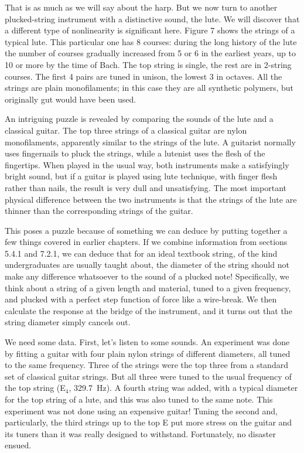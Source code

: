   That is as much as we will say about the harp. But we now turn to another 
  plucked-string instrument with a distinctive sound, the lute. We will 
  discover that a different type of nonlinearity is significant here. Figure 7 
  shows the strings of a typical lute. This particular one has 8 courses: 
  during the long history of the lute the number of courses gradually increased 
  from 5 or 6 in the earliest years, up to 10 or more by the time of Bach. The 
  top string is single, the rest are in 2-string courses. The first 4 pairs are 
  tuned in unison, the lowest 3 in octaves. All the strings are plain 
  monofilaments; in this case they are all synthetic polymers, but originally 
  gut would have been used. 


  An intriguing puzzle is revealed by comparing the sounds of the lute and a 
  classical guitar. The top three strings of a classical guitar are nylon 
  monofilaments, apparently similar to the strings of the lute. A guitarist 
  normally uses fingernails to pluck the strings, while a lutenist uses the 
  flesh of the fingertips. When played in the usual way, both instruments make 
  a satisfyingly bright sound, but if a guitar is played using lute technique, 
  with finger flesh rather than nails, the result is very dull and 
  unsatisfying. The most important physical difference between the two 
  instruments is that the strings of the lute are thinner than the 
  corresponding strings of the guitar. 

  This poses a puzzle because of something we can deduce by putting together a 
  few things covered in earlier chapters. If we combine information from 
  sections 5.4.1 and 7.2.1, we can deduce that for an ideal textbook string, of 
  the kind undergraduates are usually taught about, the diameter of the string 
  should not make any difference whatsoever to the sound of a plucked note! 
  Specifically, we think about a string of a given length and material, tuned 
  to a given frequency, and plucked with a perfect step function of force like 
  a wire-break. We then calculate the response at the bridge of the instrument, 
  and it turns out that the string diameter simply cancels out. 

  We need some data. First, let’s listen to some sounds. An experiment was done 
  by fitting a guitar with four plain nylon strings of different diameters, all 
  tuned to the same frequency. Three of the strings were the top three from a 
  standard set of classical guitar strings. But all three were tuned to the 
  usual frequency of the top string (E$_4$, 329.7~Hz). A fourth string was 
  added, with a typical diameter for the top string of a lute, and this was 
  also tuned to the same note. This experiment was not done using an expensive 
  guitar! Tuning the second and, particularly, the third strings up to the top 
  E put more stress on the guitar and its tuners than it was really designed to 
  withstand. Fortunately, no disaster ensued. 

